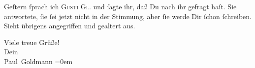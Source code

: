 \pstart
           {\pb}Geſtern{ }ſprach ich \textsc{Gusti Gl}. und{ }ſagte ihr, daß Du nach ihr gefragt
               haſt. Sie antwortete,{ }ſie{ }ſei jetzt nicht in der Stimmung, aber{ }ſie werde Dir{ }ſchon{ }ſchreiben. Sieht übrigens angegriffen und gealtert aus.\pend
           
\pstart
           Viele treue Grüße! {\\[\baselineskip]}Dein {\\[\baselineskip]}\spacefill\mbox{Paul Goldmann}\pend
           \leftskip=0em{}\endnumbering{}  \newcommand{\dateiname}{L02912}\newcommand{\titel}{Paul Goldmann an Arthur Schnitzler, 20. 4. [1900]}\newcommand{\editorInnen}{Martin Anton Müller und Laura Untner}
